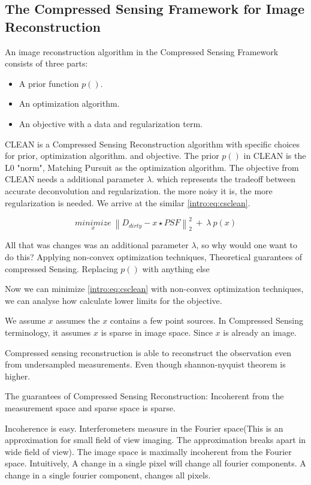 \subsection{The Compressed Sensing Framework for Image Reconstruction}
An image reconstruction algorithm in the Compressed Sensing Framework consists of three parts:

\begin{itemize}
	\item A prior function $p()$.
	\item An optimization algorithm.
	\item An objective with a data and regularization term.
\end{itemize}

CLEAN is a Compressed Sensing Reconstruction algorithm with specific choices for prior, optimization algorithm. and objective. The prior $p()$ in CLEAN is the L0 "norm", Matching Pursuit as the optimization algorithm. The objective from CLEAN needs a additional parameter $\lambda$.  which represents the tradeoff between accurate deconvolution and regularization. the more noisy it is, the more regularization is needed. We arrive at the similar \eqref{intro:eq:csclean}.

\begin{equation}\label{intro:eq:csclean}
\underset{x}{minimize} \: \left \| D_{dirty} - x \star PSF \right \|_2^2 \: + \: \lambda \: p(x) 
\end{equation}

All that was changes was an additional parameter $\lambda$, so why would one want to do this? 
Applying non-convex optimization techniques,
Theoretical guarantees of compressed Sensing.
Replacing $p()$ with anything else

Now we can minimize \eqref{intro:eq:csclean} with non-convex optimization techniques, we can analyse how calculate lower limits for the objective.


We assume $x$ assumes the $x$ contains a few point sources. In Compressed Sensing terminology, it assumes $x$ is sparse in image space. Since $x$ is already an image.


Compressed sensing reconstruction is able to reconstruct the observation even from undersampled measurements. Even though shannon-nyquist theorem is higher.

The guarantees of Compressed Sensing Reconstruction: Incoherent from the measurement space and sparse space is sparse.

Incoherence is easy. Interferometers measure in the Fourier space(This is an approximation for small field of view imaging. The approximation breaks apart in wide field of view). The image space is maximally incoherent from the Fourier space. Intuitively, A change in a single pixel will change all fourier components. A change in a single fourier component, changes all pixels.

